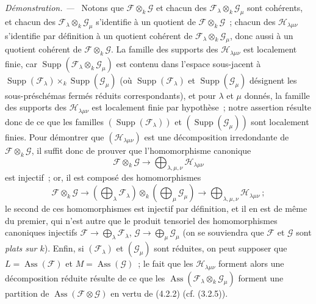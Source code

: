 \documentclass[10pt,oneside]{book}
\newenvironment{proof}{%
  \par\medskip\noindent\textit{Démonstration. ---\ }}{\par}
\begin{document}
\begin{proof}
Notons que $\mathcal F\otimes_k\mathcal G$ et chacun des
$\mathcal F_\lambda\otimes_k\mathcal G_\mu$ sont cohérents, et chacun des
$\mathcal F_\lambda\otimes_k\mathcal G_\mu$ s'identifie à un quotient de
$\mathcal F\otimes_k\mathcal G$~; chacun des $\mathcal H_{\lambda\mu\nu}$
s'identifie par définition à un quotient cohérent de
$\mathcal F_\lambda\otimes_k\mathcal G_\mu$, donc aussi à un quotient
cohérent de $\mathcal F\otimes_k\mathcal G$. La famille des supports des
$\mathcal H_{\lambda\mu\nu}$ est localement finie, car
$\operatorname{Supp}(\mathcal F_\lambda\otimes_k\mathcal G_\mu)$ est contenu
dans l'espace sous-jacent à
$\operatorname{Supp}(\mathcal F_\lambda)\times_k
\operatorname{Supp}(\mathcal G_\mu)$ (où
$\operatorname{Supp}(\mathcal F_\lambda)$ et
$\operatorname{Supp}(\mathcal G_\mu)$ désignent les sous-préschémas fermés
réduits correspondants), et pour $\lambda$ et $\mu$ donnés, la famille des
supports des $\mathcal H_{\lambda\mu\nu}$ est localement finie par hypothèse~;
notre assertion résulte donc de ce que les familles
$(\operatorname{Supp}(\mathcal F_\lambda))$ et
$(\operatorname{Supp}(\mathcal G_\mu))$ sont localement finies. Pour démontrer
que $(\mathcal H_{\lambda\mu\nu})$ est une décomposition irredondante de
$\mathcal F\otimes_k\mathcal G$, il suffit donc de prouver que
l'homomorphisme canonique
\[
\mathcal F\otimes_k\mathcal G
\longrightarrow\bigoplus_{\lambda,\mu,\nu}\mathcal H_{\lambda\mu\nu}
\]
est injectif~; or, il est composé des homomorphismes
\[
\mathcal F\otimes_k\mathcal G
\longrightarrow
\left(\bigoplus_\lambda\mathcal F_\lambda\right)\otimes_k
\left(\bigoplus_\mu\mathcal G_\mu\right)
\longrightarrow\bigoplus_{\lambda,\mu,\nu}\mathcal H_{\lambda\mu\nu}~;
\]
le second de ces homomorphismes est injectif par définition, et il en est de
même du premier, qui n'est autre que le produit tensoriel des homomorphismes
canoniques injectifs
$\mathcal F\to\bigoplus_\lambda\mathcal F_\lambda$,
$\mathcal G\to\bigoplus_\mu\mathcal G_\mu$ (on se souviendra que
$\mathcal F$ et $\mathcal G$ sont \emph{plats sur $k$}). Enfin, si
$(\mathcal F_\lambda)$ et $(\mathcal G_\mu)$ sont réduites, on peut supposer
que $L=\operatorname{Ass}(\mathcal F)$ et
$M=\operatorname{Ass}(\mathcal G)$~; le fait que les
$\mathcal H_{\lambda\mu\nu}$ forment alors une décomposition réduite résulte
de ce que les $\operatorname{Ass}(\mathcal F_\lambda\otimes_k
\mathcal G_\mu)$ forment une partition de
$\operatorname{Ass}(\mathcal F\otimes\mathcal G)$ en vertu de (4.2.2)
(cf. (3.2.5)).
\end{proof}
\end{document}

